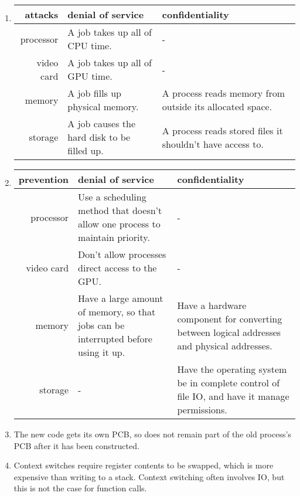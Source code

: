 \documentclass[11pt]{article}
\begin{document}
\begin{enumerate}
\item
  \noindent
  \begin{tabularx}{\textwidth}[t]{r|XX}
    attacks & denial of service & confidentiality \\
    \hline
    processor & A job takes up all of CPU time. & - \\
    video card & A job takes up all of GPU time. & - \\
    memory & A job fills up physical memory. & A process reads memory from outside its allocated space. \\
    storage & A job causes the hard disk to be filled up. & A process reads stored files it shouldn't have access to. \\
  \end{tabularx}
\item
  \begin{tabularx}{\textwidth}[t]{r|XX}
    prevention & denial of service & confidentiality \\
    \hline
    processor & Use a scheduling method that doesn't allow one process to maintain priority. & - \\
    video card & Don't allow processes direct access to the GPU. & - \\
    memory & Have a large amount of memory, so that jobs can be interrupted before using it up. & Have a hardware component for converting between logical addresses and physical addresses. \\
    storage & - & Have the operating system be in complete control of file IO, and have it manage permissions. \\
  \end{tabularx}
\item The new code gets its own PCB, so does not remain part of the old process's PCB after it has been constructed.
\item Context switches require register contents to be swapped, which is more expensive than writing to a stack. Context switching often involves IO, but this is not the case for function calls.
\end{enumerate}
\end{document}
